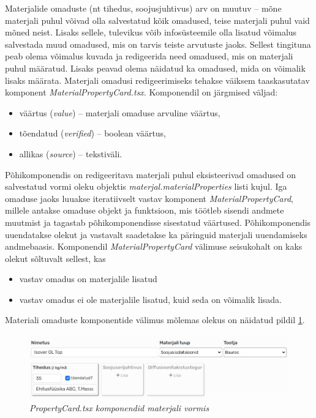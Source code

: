 Materjalide omaduste (nt tihedus, soojusjuhtivus) arv on muutuv -- mõne materjali puhul võivad olla salvestatud
kõik omadused, teise materjali puhul vaid mõned neist. Lisaks sellele, tulevikus võib infosüsteemile olla lisatud
võimalus salvestada muud omadused, mis on tarvis teiste arvutuste jaoks. Sellest tingituna peab olema võimalus kuvada
ja redigeerida need omadused, mis on materjali puhul määratud. Lisaks peavad olema näidatud ka omadused,
mida on võimalik lisaks määrata. Materjali omadusi redigeerimiseks tehakse väiksem taaskasutatav 
komponent \textit{MaterialPropertyCard.tsx}. Komponendil on järgmised väljad:
\begin{itemize}
    \item väärtus (\textit{value}) -- materjali omaduse arvuline väärtus,
    \item tõendatud (\textit{verified}) -- boolean väärtus,
    \item allikas (\textit{source}) -- tekstiväli.
\end{itemize}

Põhikomponendis on redigeeritava materjali puhul eksisteerivad omadused on salvestatud vormi oleku objektis \textit{materjal.materialProperties}
listi kujul. Iga omaduse jaoks luuakse iteratiivselt vastav komponent \textit{MaterialPropertyCard}, millele antakse omaduse objekt ja funktsioon, 
mis töötleb sisendi andmete muutmist ja tagastab põhikomponendisse sisestatud väärtused. Põhikomponendis uuendatakse olekut ja vastavalt
saadetakse ka päringuid materjali uuendamiseks andmebaasis. Komponendil \textit{MaterialPropertyCard} välimuse seisukohalt on kaks olekut sõltuvalt 
sellest, kas 
\begin{itemize}
    \item vastav omadus on materjalile lisatud
    \item vastav omadus ei ole materjalile lisatud, kuid seda on võimalik lisada.  
\end{itemize}

Materiali omaduste komponentide välimus mõlemas olekus on näidatud pildil \ref{fig:development_frontend_propertycard}.
 \begin{figure}[ht]
    \centering
    \includegraphics[width=1\textwidth]{figures/development/frontend_propertycard.JPG}
    \caption[\textit{PropertyCard} materjali omaduste komponendid materjali vormis]{\textit{PropertyCard.tsx komponendid materjali vormis}}
    \label{fig:development_frontend_propertycard}
\end{figure}

